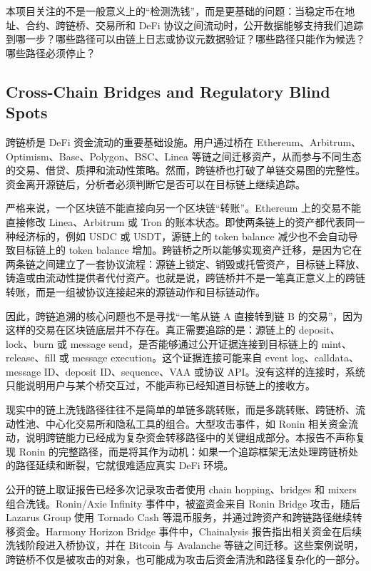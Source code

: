 \documentclass[12pt,a4paper]{ctexart}
\begin{document}
本项目关注的不是一般意义上的``检测洗钱''，而是更基础的问题：当稳定币在地址、合约、跨链桥、交易所和
DeFi
协议之间流动时，公开数据能够支持我们追踪到哪一步？哪些路径可以由链上日志或协议元数据验证？哪些路径只能作为候选？哪些路径必须停止？

\hypertarget{cross-chain-bridges-and-regulatory-blind-spots}{%
\subsection{Cross-Chain Bridges and Regulatory Blind
Spots}\label{cross-chain-bridges-and-regulatory-blind-spots}}

跨链桥是 DeFi 资金流动的重要基础设施。用户通过桥在
Ethereum、Arbitrum、Optimism、Base、Polygon、BSC、Linea
等链之间迁移资产，从而参与不同生态的交易、借贷、质押和流动性策略。然而，跨链桥也打破了单链交易图的完整性。资金离开源链后，分析者必须判断它是否可以在目标链上继续追踪。

严格来说，一个区块链不能直接向另一个区块链``转账''。Ethereum
上的交易不能直接修改 Linea、Arbitrum 或 Tron
的账本状态。即使两条链上的资产都代表同一种经济标的，例如 USDC 或
USDT，源链上的 token balance 减少也不会自动导致目标链上的 token balance
增加。跨链桥之所以能够实现资产迁移，是因为它在两条链之间建立了一套协议流程：源链上锁定、销毁或托管资产，目标链上释放、铸造或由流动性提供者代付资产。也就是说，跨链桥并不是一笔真正意义上的跨链转账，而是一组被协议连接起来的源链动作和目标链动作。

因此，跨链追溯的核心问题也不是寻找``一笔从链 A 直接转到链 B
的交易''，因为这样的交易在区块链底层并不存在。真正需要追踪的是：源链上的
deposit、lock、burn 或 message
send，是否能够通过公开证据连接到目标链上的 mint、release、fill 或
message execution。这个证据连接可能来自 event log、calldata、message
ID、deposit ID、sequence、VAA 或协议
API。没有这样的连接时，系统只能说明用户与某个桥交互过，不能声称已经知道目标链上的接收方。

现实中的链上洗钱路径往往不是简单的单链多跳转账，而是多跳转账、跨链桥、流动性池、中心化交易所和隐私工具的组合。大型攻击事件，如
Ronin
相关资金流动，说明跨链能力已经成为复杂资金转移路径中的关键组成部分。本报告不声称复现
Ronin
的完整路径，而是将其作为动机：如果一个追踪框架无法处理跨链桥处的路径延续和断裂，它就很难适应真实
DeFi 环境。

公开的链上取证报告已经多次记录攻击者使用 chain hopping、bridges 和
mixers 组合洗钱。Ronin/Axie Infinity 事件中，被盗资金来自 Ronin Bridge
攻击，随后 Lazarus Group 使用 Tornado Cash
等混币服务，并通过跨资产和跨链路径继续转移资金。Harmony Horizon Bridge
事件中，Chainalysis 报告指出相关资金在后续洗钱阶段进入桥协议，并在
Bitcoin 与 Avalanche
等链之间迁移。这些案例说明，跨链桥不仅是被攻击的对象，也可能成为攻击后资金清洗和路径复杂化的一部分。
\end{document}
